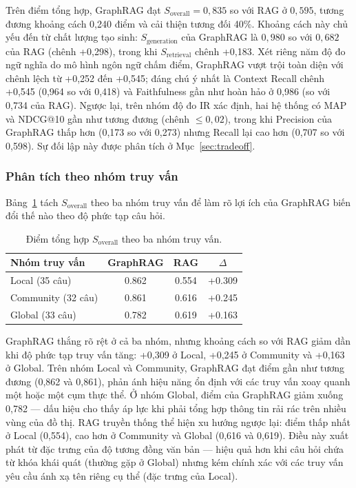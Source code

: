 Trên điểm tổng hợp, GraphRAG đạt $S_{\text{overall}} = 0{,}835$ so với RAG ở $0{,}595$, tương đương khoảng cách 0,240 điểm và cải thiện tương đối 40\%. Khoảng cách này chủ yếu đến từ chất lượng tạo sinh: $S_{\text{generation}}$ của GraphRAG là $0{,}980$ so với $0{,}682$ của RAG (chênh +0,298), trong khi $S_{\text{retrieval}}$ chênh +0,183. Xét riêng năm độ đo ngữ nghĩa do mô hình ngôn ngữ chấm điểm, GraphRAG vượt trội toàn diện với chênh lệch từ +0,252 đến +0,545; đáng chú ý nhất là Context Recall chênh +0,545 (0,964 so với 0,418) và Faithfulness gần như hoàn hảo ở 0,986 (so với 0,734 của RAG). Ngược lại, trên nhóm độ đo IR xác định, hai hệ thống có MAP và NDCG@10 gần như tương đương (chênh $\leq 0{,}02$), trong khi Precision của GraphRAG thấp hơn (0,173 so với 0,273) nhưng Recall lại cao hơn (0,707 so với 0,598). Sự đối lập này được phân tích ở Mục~\ref{sec:tradeoff}.

\subsubsection{Phân tích theo nhóm truy vấn}
\label{sec:by_category}

Bảng~\ref{tab:baseline_by_category} tách $S_{\text{overall}}$ theo ba nhóm truy vấn để làm rõ lợi ích của GraphRAG biến đổi thế nào theo độ phức tạp câu hỏi.

\begin{table}[h]
\centering
\caption{Điểm tổng hợp $S_{\text{overall}}$ theo ba nhóm truy vấn.}
\label{tab:baseline_by_category}
\begin{tabular}{lccc}
\hline
\textbf{Nhóm truy vấn} & \textbf{GraphRAG} & \textbf{RAG} & \textbf{$\Delta$} \\
\hline
Local (35 câu)     & 0.862 & 0.554 & +0.309 \\
Community (32 câu) & 0.861 & 0.616 & +0.245 \\
Global (33 câu)    & 0.782 & 0.619 & +0.163 \\
\hline
\end{tabular}
\end{table}

GraphRAG thắng rõ rệt ở cả ba nhóm, nhưng khoảng cách so với RAG giảm dần khi độ phức tạp truy vấn tăng: +0,309 ở Local, +0,245 ở Community và +0,163 ở Global. Trên nhóm Local và Community, GraphRAG đạt điểm gần như tương đương (0,862 và 0,861), phản ánh hiệu năng ổn định với các truy vấn xoay quanh một hoặc một cụm thực thể. Ở nhóm Global, điểm của GraphRAG giảm xuống 0,782 --- dấu hiệu cho thấy áp lực khi phải tổng hợp thông tin rải rác trên nhiều vùng của đồ thị. RAG truyền thống thể hiện xu hướng ngược lại: điểm thấp nhất ở Local (0,554), cao hơn ở Community và Global (0,616 và 0,619). Điều này xuất phát từ đặc trưng của độ tương đồng văn bản --- hiệu quả hơn khi câu hỏi chứa từ khóa khái quát (thường gặp ở Global) nhưng kém chính xác với các truy vấn yêu cầu ánh xạ tên riêng cụ thể (đặc trưng của Local).

